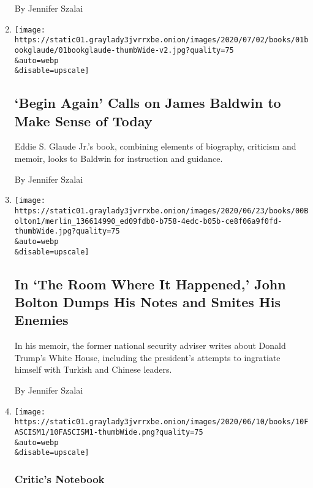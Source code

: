 \begin{enumerate}
  By Jennifer Szalai
\item
  \href{/2020/06/30/books/review-begin-again-james-baldwin-eddie-glaude-jr.html}{}

  \texttt{[image: https://static01.graylady3jvrrxbe.onion/images/2020/07/02/books/01bookglaude/01bookglaude-thumbWide-v2.jpg?quality=75\\\&auto=webp\\\&disable=upscale]}

  \hypertarget{begin-again-calls-on-james-baldwin-to-make-sense-of-today}{%
  \subsection{`Begin Again' Calls on James Baldwin to Make Sense of
  Today}\label{begin-again-calls-on-james-baldwin-to-make-sense-of-today}}

  Eddie S. Glaude Jr.'s book, combining elements of biography, criticism
  and memoir, looks to Baldwin for instruction and guidance.

  By Jennifer Szalai
\item
  \href{/2020/06/17/books/review-room-where-it-happened-john-bolton-memoir.html}{}

  \texttt{[image: https://static01.graylady3jvrrxbe.onion/images/2020/06/23/books/00Bolton1/merlin\_136614990\_ed09fdb0-b758-4edc-b05b-ce8f06a9f0fd-thumbWide.jpg?quality=75\\\&auto=webp\\\&disable=upscale]}

  \hypertarget{in-the-room-where-it-happened-john-bolton-dumps-his-notes-and-smites-his-enemies}{%
  \subsection{In `The Room Where It Happened,' John Bolton Dumps His
  Notes and Smites His
  Enemies}\label{in-the-room-where-it-happened-john-bolton-dumps-his-notes-and-smites-his-enemies}}

  In his memoir, the former national security adviser writes about
  Donald Trump's White House, including the president's attempts to
  ingratiate himself with Turkish and Chinese leaders.

  By Jennifer Szalai
\item
  \href{/2020/06/10/books/fascism-debate-donald-trump.html}{}

  \texttt{[image: https://static01.graylady3jvrrxbe.onion/images/2020/06/10/books/10FASCISM1/10FASCISM1-thumbWide.png?quality=75\\\&auto=webp\\\&disable=upscale]}

  \hypertarget{critics-notebook}{%
  \subsubsection{Critic's Notebook}\label{critics-notebook}}


\end{enumerate}
